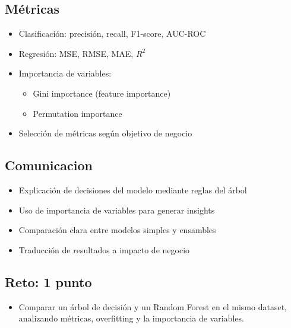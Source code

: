 \documentclass[12pt,a4paper,openany,oneside]{book}
\begin{document}
\begin{itemize}
\subsection{Métricas}
\begin{itemize}
    \item Clasificación: precisión, recall, F1-score, AUC-ROC
    \item Regresión: MSE, RMSE, MAE, $R^2$
    \item Importancia de variables:
    \begin{itemize}
        \item Gini importance (feature importance)
        \item Permutation importance
    \end{itemize}
    \item Selección de métricas según objetivo de negocio
\end{itemize}

\subsection{Comunicacion}
\begin{itemize}
    \item Explicación de decisiones del modelo mediante reglas del árbol
    \item Uso de importancia de variables para generar insights
    \item Comparación clara entre modelos simples y ensambles
    \item Traducción de resultados a impacto de negocio
\end{itemize}

\subsection{Reto: 1 punto}
\begin{itemize}
    \item Comparar un árbol de decisión y un Random Forest en el mismo dataset, analizando métricas, overfitting y la importancia de variables.
\end{itemize}


\end{itemize}
\end{document}
